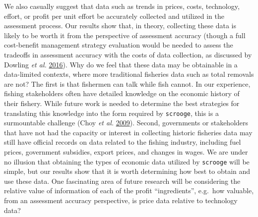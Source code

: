 \documentclass[twoside,12pt,final]{ucthesis-CA2012}
\begin{document}
\begin{ucmainmatter}
We also casually suggest that data such as trends in prices, costs,
technology, effort, or profit per unit effort be accurately collected
and utilized in the assessment process. Our results show that, in
theory, collecting these data is likely to be worth it from the
perspective of assessment accuracy (though a full cost-benefit
management strategy evaluation would be needed to assess the tradeoffs
in assessment accuracy with the costs of data collection, as discussed
by Dowling \emph{et al.} \protect\hyperlink{ref-Dowling2016}{2016}). Why
do we feel that these data may be obtainable in a data-limited contexts,
where more traditional fisheries data such as total removals are not?
The first is that fishermen can talk while fish cannot. In our
experience, fishing stakeholders often have detailed knowledge on the
economic history of their fishery. While future work is needed to
determine the best strategies for translating this knowledge into the
form required by \texttt{scrooge}, this is a surmountable challenge
(Choy \emph{et al.} \protect\hyperlink{ref-Choy2009}{2009}). Second,
governments or stakeholders that have not had the capacity or interest
in collecting historic fisheries data may still have official records on
data related to the fishing industry, including fuel prices, government
subsidies, export prices, and changes in wages. We are under no illusion
that obtaining the types of economic data utilized by \texttt{scrooge}
will be simple, but our results show that it is worth determining how
best to obtain and use these data. One fascinating area of future
research will be considering the relative value of information of each
of the profit ``ingredients'', e.g.~how valuable, from an assessment
accuracy perspective, is price data relative to technology data?


\end{ucmainmatter}
\end{document}
